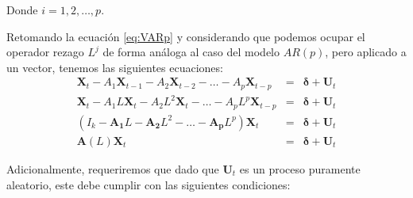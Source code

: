 \documentclass[
]{book}
\begin{document}
Donde \(i = 1, 2, \ldots, p\).

Retomando la ecuación \eqref{eq:VARp} y considerando que podemos ocupar el operador rezago \(L^j\) de forma análoga al caso del modelo \(AR(p)\), pero aplicado a un vector, tenemos las siguientes ecuaciones:
\begin{eqnarray}
    \mathbf{X}_t - A_1 \mathbf{X}_{t-1} - A_2 \mathbf{X}_{t-2} - \ldots - A_p \mathbf{X}_{t-p} & = & \boldsymbol{\delta} + \mathbf{U}_{t} \nonumber \\
    \mathbf{X}_t - A_1 L \mathbf{X}_{t} - A_2 L^2 \mathbf{X}_{t} - \ldots - A_p L^p \mathbf{X}_{t-p} & = & \boldsymbol{\delta} + \mathbf{U}_{t} \nonumber \\
    (I_k - \mathbf{A_1} L - \mathbf{A_2} L^2 - \ldots - \mathbf{A_p} L^p) \mathbf{X}_t & = & \boldsymbol{\delta} + \mathbf{U}_{t} \nonumber \\
    \mathbf{A}(L) \mathbf{X}_t & = & \boldsymbol{\delta} + \mathbf{U}_{t}
    \label{eq:VARCorto}
\end{eqnarray}

Adicionalmente, requeriremos que dado que \(\mathbf{U}_t\) es un proceso puramente aleatorio, este debe cumplir con las siguientes condiciones:
\end{document}

